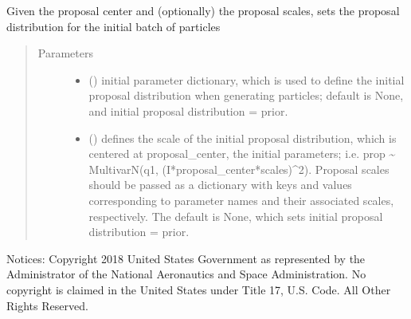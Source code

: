 \documentclass[letterpaper,10pt,english]{sphinxmanual}
\begin{document}
\begin{fulllineitems}
\begin{fulllineitems}
\label{\detokenize{source_code:smcpy.smc.particle_initializer.ParticleInitializer.set_proposal_distribution}}
Given the proposal center and (optionally) the proposal scales, sets
the proposal distribution for the initial batch of particles
\begin{quote}\begin{description}
\item[{Parameters}] \leavevmode\begin{itemize}
\item {} 
 () \textendash{} initial parameter dictionary, which is used to
define the initial proposal distribution when generating particles;
default is None, and initial proposal distribution = prior.

\item {} 
 () \textendash{} defines the scale of the initial proposal
distribution, which is centered at proposal\_center, the initial
parameters; i.e. prop \textasciitilde{} MultivarN(q1, (I*proposal\_center*scales)\textasciicircum{}2).
Proposal scales should be passed as a dictionary with keys and
values corresponding to parameter names and their associated scales,
respectively. The default is None, which sets initial proposal
distribution = prior.

\end{itemize}

\end{description}\end{quote}

\end{fulllineitems}


\end{fulllineitems}

\label{\detokenize{source_code:module-smcpy.smc.particle_updater}}
Notices:
Copyright 2018 United States Government as represented by the Administrator of
the National Aeronautics and Space Administration. No copyright is claimed in
the United States under Title 17, U.S. Code. All Other Rights Reserved.
\end{document}
